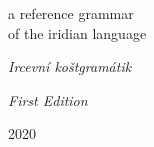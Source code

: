 \begin{titlepage}
        \centering
        \vspace{4\baselineskip}
        {\huge\cscaps
        a reference grammar\\of the iridian language\par}
        \vspace{\baselineskip}
        {\Large\itshape Ircevní koštgramátik}

        \vfill
        {\em First Edition}\par
        {2020}
\end{titlepage}